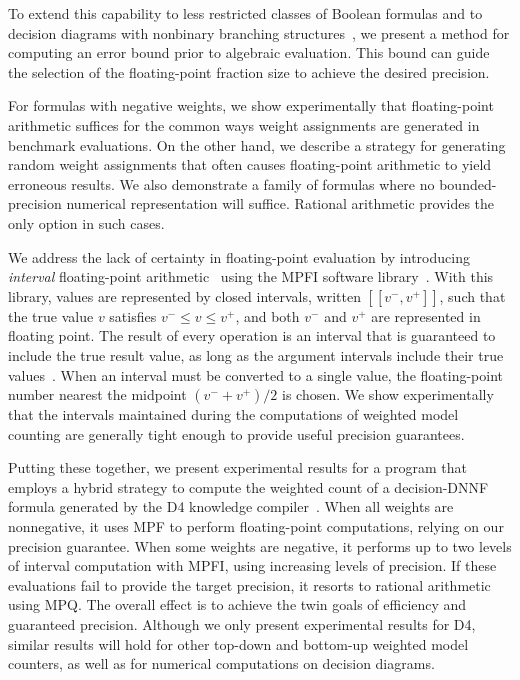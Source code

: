 \documentclass[letterpaper,USenglish,cleveref, autoref, thm-restate]{lipics-v2021}
\newcommand{\vmin}{v^{-}}
\newcommand{\vmax}{v^{+}}
\newcommand{\interval}[1]{[\![#1]\!]}
\begin{document}
To extend this capability to less restricted classes of Boolean
formulas and to decision diagrams with nonbinary branching
structures~\cite{darwiche:ijcai:2011,srinivasan:iccad:1990}, we
present a method for computing an error bound prior to algebraic
evaluation.  This bound can guide the selection of the floating-point fraction size to
achieve the desired precision.

For formulas with negative weights, 
we show experimentally that floating-point
arithmetic suffices for the common ways weight assignments are generated in benchmark evaluations.
On the other hand, we
describe a strategy for generating random weight assignments that
often causes floating-point arithmetic to yield erroneous results.
We also
demonstrate a family of
formulas where no bounded-precision numerical representation will
suffice.  Rational arithmetic provides the only option in such cases.


We address the lack of certainty in floating-point
evaluation by introducing \emph{interval} floating-point
arithmetic~\cite{hickey:jacm:2001} using the MPFI software
library~\cite{revol:rc:2005}. With this library, values are
represented by closed intervals, written $\interval{\vmin, \vmax}$, such that the
true value $v$ satisfies $\vmin \leq v \leq \vmax$, and both $\vmin$ and $\vmax$ are
represented in floating point.  The result of every operation is an
interval that is guaranteed to include the true result value, as long
as the argument intervals include their true values~\cite{hickey:jacm:2001,muller:hfpa:2018}.
When an interval must be converted to a single value, the floating-point number nearest the midpoint $(\vmin+\vmax)/2$ is chosen.
We show
experimentally that the intervals maintained during the computations
of weighted model counting are generally tight enough to provide
useful precision guarantees.

Putting these together, we present experimental results for a program
that employs a hybrid strategy to compute the weighted count of a decision-DNNF formula
generated by the D4 knowledge compiler~\cite{lagniez:ijcai:2017}.
When all weights are nonnegative, it uses MPF to
perform floating-point computations, relying on our precision
guarantee.  When some weights are negative, it performs up to two
levels of interval computation with MPFI, using increasing levels of
precision.  If these evaluations fail to provide the target precision,
it resorts to rational arithmetic using MPQ\@.  The overall effect
is to achieve the twin goals of efficiency and guaranteed precision.
Although we only present experimental results for D4, similar results will hold for other top-down and bottom-up weighted model counters, as well as
for numerical computations on decision diagrams.
\end{document}
